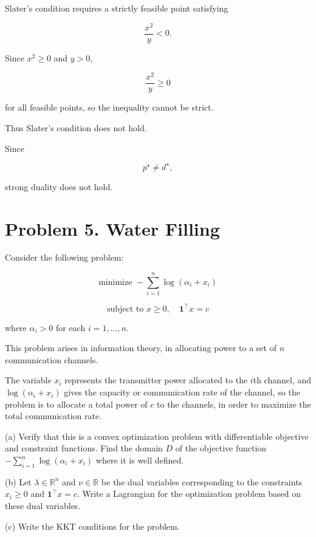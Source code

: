 \documentclass[
	12pt,
]{fphw}
\begin{document}
\begin{enumerate}
Slater’s condition requires a strictly feasible point satisfying

\[
\frac{x^2}{y}<0.
\]

Since \(x^2\ge0\) and \(y>0\),

\[
\frac{x^2}{y}\ge0
\]

for all feasible points, so the inequality cannot be strict.

Thus Slater’s condition does not hold.

Since

\[
p^\star\ne d^\star,
\]

strong duality does not hold.

\end{enumerate}



\newpage
\section*{Problem 5. Water Filling}

Consider the following problem:

\[
\text{minimize } -\sum_{i=1}^{n} \log(\alpha_i + x_i)
\tag{20}
\]

\[
\text{subject to } x \ge 0,\quad \mathbf{1}^\top x = c
\tag{21}
\]

where \(\alpha_i > 0\) for each \(i = 1,\ldots,n\).

This problem arises in information theory, in allocating power to a set of \(n\) communication channels.

The variable \(x_i\) represents the transmitter power allocated to the \(i\)th channel,
and \(\log(\alpha_i + x_i)\) gives the capacity or communication rate of the channel,
so the problem is to allocate a total power of \(c\) to the channels,
in order to maximize the total communication rate.

(a) Verify that this is a convex optimization problem with differentiable objective and constraint functions.
Find the domain \(D\) of the objective function \(-\sum_{i=1}^n \log(\alpha_i + x_i)\) where it is well defined.

(b) Let \(\lambda \in \mathbb{R}^n\) and \(\nu \in \mathbb{R}\) be the dual variables corresponding to the constraints \(x_i \ge 0\) and \(\mathbf{1}^\top x = c\).
Write a Lagrangian for the optimization problem based on these dual variables.

(c) Write the KKT conditions for the problem.
\end{document}
